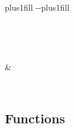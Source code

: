 \documentclass[letterpaper,10pt,english]{sphinxmanual}
\begin{document}
\begin{savenotes}
\sphinxatlongtablestart
\sphinxthistablewithglobalstyle
\sphinxthistablewithnovlinesstyle
\makeatletter
  \LTleft \@totalleftmargin plus1fill
  \LTright\dimexpr\columnwidth-\@totalleftmargin-\linewidth\relax plus1fill
\makeatother
\begin{longtable}{}
\sphinxtoprule
\endfirsthead

\\
\sphinxtoprule
\endhead

\sphinxbottomrule
{}\\
\endfoot

\endlastfoot
\sphinxtableatstartofbodyhook

\sphinxAtStartPar
{\hyperref[\detokenize{autoapi/generate_data_catalogue/index:generate_data_catalogue.config_path}]{}}
&
\sphinxAtStartPar

\\
\sphinxbottomrule
\end{longtable}
\sphinxtableafterendhook
\sphinxatlongtableend
\end{savenotes}


\subsection{Functions}
\label{\detokenize{autoapi/generate_data_catalogue/index:functions}}
\end{document}
